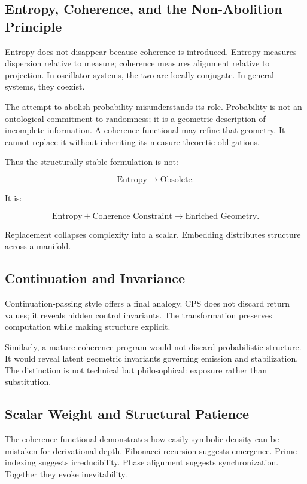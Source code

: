 \documentclass[12pt]{article}
\begin{document}
\subsection{Entropy, Coherence, and the Non-Abolition Principle}

Entropy does not disappear because coherence is introduced. Entropy measures dispersion relative to measure; coherence measures alignment relative to projection. In oscillator systems, the two are locally conjugate. In general systems, they coexist.

The attempt to abolish probability misunderstands its role. Probability is not an ontological commitment to randomness; it is a geometric description of incomplete information. A coherence functional may refine that geometry. It cannot replace it without inheriting its measure-theoretic obligations.

Thus the structurally stable formulation is not:

\[
  \text{Entropy} \rightarrow \text{Obsolete}.
\]

It is:

\[
  \text{Entropy} + \text{Coherence Constraint}
  \rightarrow \text{Enriched Geometry}.
\]

Replacement collapses complexity into a scalar. Embedding distributes structure across a manifold.

\subsection{Continuation and Invariance}

Continuation-passing style offers a final analogy. CPS does not discard return values; it reveals hidden control invariants. The transformation preserves computation while making structure explicit.

Similarly, a mature coherence program would not discard probabilistic structure. It would reveal latent geometric invariants governing emission and stabilization. The distinction is not technical but philosophical: exposure rather than substitution.

\subsection{Scalar Weight and Structural Patience}

The coherence functional demonstrates how easily symbolic density can be mistaken for derivational depth. Fibonacci recursion suggests emergence. Prime indexing suggests irreducibility. Phase alignment suggests synchronization. Together they evoke inevitability.
\end{document}
